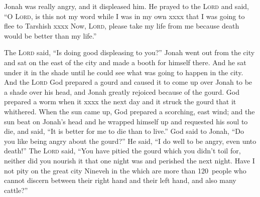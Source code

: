 
\begin{inparaenum}
   Jonah was really angry, and it displeased him.%
   He prayed to the \textsc{Lord} and said, ``O \textsc{Lord}, is this not my word while I was in my own xxxx that I was going to flee to Tarshish xxxx%
   Now, \textsc{Lord}, please take my life from me because death would be better than my life.''%
  
   The \textsc{Lord} said, ``Is doing good displeasing to you?''%
   Jonah went out from the city and sat on the east of the city and made a booth for himself there. And he sat under it in the shade until he could see what was going to happen in the city.%
   And the \textsc{Lord} God prepared a gourd and caused it to come up over Jonah to be a shade over his head, and Jonah greatly rejoiced because of the gourd.%
   God prepared a worm when it xxxx the next day and it struck the gourd that it whithered.%
   When the sun came up, God prepared a scorching, east wind; and the sun beat on Jonah's head and he wrapped himself up and requested his soul to die, and said, ``It is better for me to die than to live.''%
   God said to Jonah, ``Do you like being angry about the gourd?'' He said, ``I do well to be angry, even unto death!''%
   The \textsc{Lord} said, ``You have pitied the gourd which you didn't toil for, neither did you nourish it that one night was and perished the next night.%
   Have I not pity on the great city Nineveh in the which are more than 120~people who cannot discern between their right hand and their left hand, and also many cattle?''%
\end{inparaenum}
